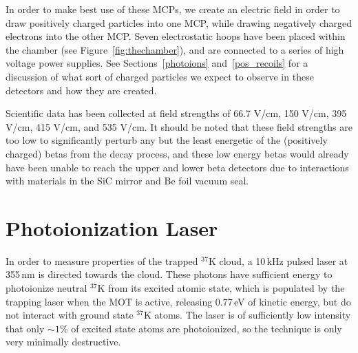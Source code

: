 In order to make best use of these MCPs, we create an electric field in order to draw positively charged particles into one MCP, while drawing negatively charged electrons into the other MCP.  Seven electrostatic hoops have been placed within the chamber (see Figure~\ref{fig:thechamber}), and are connected to a series of high voltage power supplies.  See Sections~\ref{photoions} and~\ref{pos_recoils} for a discussion of what sort of charged particles we expect to observe in these detectors and how they are created.  

Scientific data has been collected at field strengths of 66.7 V/cm, 150 V/cm, 395 V/cm, 415 V/cm, and 535 V/cm.  It should be noted that these field strengths are too low to significantly perturb any but the least energetic of the (positively charged) betas from the decay process, and these low energy betas would already have been unable to reach the upper and lower beta detectors due to interactions with materials in the SiC mirror and Be foil vacuum seal.  



\section{Photoionization Laser}
\label{cloud}
\label{photoions}

In order to measure properties of the trapped $^{37}\textrm{K}$ cloud, a 10\,kHz pulsed laser at 355\,nm is directed towards the cloud.  These photons have sufficient energy to photoionize neutral $^{37}\textrm{K}$ from its excited atomic state, which is populated by the trapping laser when the MOT is active, releasing 0.77\,eV of kinetic energy, but do not interact with ground state $^{37}\textrm{K}$ atoms.  The laser is of sufficiently low intensity that only $\sim 1\%$ of excited state atoms are photoionized, so the technique is only very minimally destructive.



